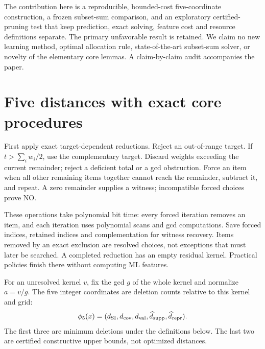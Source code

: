 \documentclass[10pt,english]{article}
\begin{document}
The contribution here is a reproducible, bounded-cost five-coordinate construction, a frozen subset-sum comparison, and an exploratory certified-pruning test that keep prediction, exact solving, feature cost and resource definitions separate. The primary unfavorable result is retained. We claim no new learning method, optimal allocation rule, state-of-the-art subset-sum solver, or novelty of the elementary core lemmas. A claim-by-claim audit accompanies the paper.

\section{Five distances with exact core procedures}
First apply exact target-dependent reductions. Reject an out-of-range target. If \(t>\sum_iw_i/2\), use the complementary target. Discard weights exceeding the current remainder; reject a deficient total or a gcd obstruction. Force an item when all other remaining items together cannot reach the remainder, subtract it, and repeat. A zero remainder supplies a witness; incompatible forced choices prove NO.

These operations take polynomial bit time: every forced iteration removes an item, and each iteration uses polynomial scans and gcd computations. Save forced indices, retained indices and complementation for witness recovery. Items removed by an exact exclusion are resolved choices, not exceptions that must later be searched. A completed reduction has an empty residual kernel. Practical policies finish there without computing ML features.

For an unresolved kernel \(v\), fix the gcd \(g\) of the whole kernel and normalize \(a=v/g\). The five integer coordinates are deletion counts relative to this kernel and grid:
\[
\phi_5(x)=(d_{\rm SI},d_{\rm cov},d_{\rm val},\widehat d_{\rm supp},\widehat d_{\rm repr}).
\]
The first three are minimum deletions under the definitions below. The last two are certified constructive upper bounds, not optimized distances.
\end{document}
